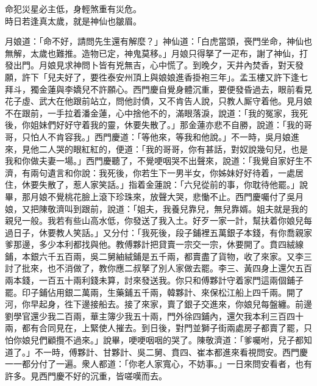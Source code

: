 \begin{myquote} 
命犯災星必主低，身輕煞重有災危。\\時日若逢真太歲，就是神仙也皺眉。
\end{myquote} 

月娘道：「命不好，請問先生還有解麼？」神仙道：「白虎當頭，䘮門坐命，神仙也無解，太歲也難推。造物已定，神鬼莫移。」月娘只得拏了一疋布，謝了神仙，打發出門。月娘見求神問卜皆有兇無吉，心中慌了。到晚夕，天井內焚香，對天發願，許下「兒夫好了，要徃泰安州頂上與娘娘進香掛袍三年」。孟玉樓又許下逢七拜斗，{}獨金蓮與李嬌兒不許願心。{}西門慶自覺身體沉重，要便發昏過去，眼前看見花子虛、武大在他跟前站立，問他討債，又不肯告人說，只教人厮守着他。見月娘不在跟前，一手拉着潘金蓮，心中捨他不的，滿眼落淚，說道：「我的冤家，我死後，你姐妹們好好守着我的靈，休要失散了。」{}那金蓮亦悲不自勝，說道：「我的哥哥，只怕人不肯容我。」西門慶道：「等他來，等我和他說。」不一時，吳月娘進來，見他二人哭的眼紅紅的，便道：「我的哥哥，你有甚話，對奴說幾句兒，也是我和你做夫妻一場。」{}西門慶聽了，不覺哽咽哭不出聲來，說道：「我覺自家好生不濟，有兩句遺言和你說：我死後，你若生下一男半女，你姊妹好好待着，一處居住，休要失散了，惹人家笑話。」指着金蓮說：「六兒從前的事，你耽待他罷。」說畢，那月娘不覺桃花臉上滾下珍珠來，放聲大哭，悲慟不止。西門慶囑付了吳月娘，又把陳敬濟叫到跟前，說道：「姐夫，我養兒靠兒，無兒靠婿。姐夫就是我的親兒一般。{}我若有些山高水低，你發送了我入土。好歹一家一計，幫扶着你娘兒每過日子，休要教人笑話。」又分付：「我死後，段子鋪裡五萬銀子本錢，有你喬親家爹那邊，多少本利都找與他。教傅夥計把貸賣一宗交一宗，休要開了。賁四絨線鋪，本銀六千五百兩，吳二舅紬絨鋪是五千兩，都賣盡了貨物，收了來家。又李三討了批來，也不消做了，教你應二叔拏了別人家做去罷。李三、黃四身上還欠五百兩本錢，一百五十兩利錢未算，討來發送我。你只和傅夥計守着家門這兩個鋪子罷。印子鋪佔用銀二萬兩，生藥鋪五千兩，韓夥計、來保松江船上四千兩。開了河，你早起身，徃下邊接船去。接了來家，賣了銀子交進來，你娘兒每盤纏。前邊劉學官還少我二百兩，華主簿少我五十兩，門外徐四鋪內，還欠我本利三百四十兩，都有合同見在，上緊使人摧去。到日後，對門並獅子街兩處房子都賣了罷，只怕你娘兒們顧攬不過來。」說畢，哽哽咽咽的哭了。{}陳敬濟道：「爹囑咐，兒子都知道了。」不一時，傅夥計、甘夥計、吳二舅、賁四、崔本都進來看視問安。西門慶一一都分付了一遍。衆人都道：「你老人家寬心，不妨事。」一日來問安看者，也有許多。見西門慶不好的沉重，皆嗟嘆而去。

